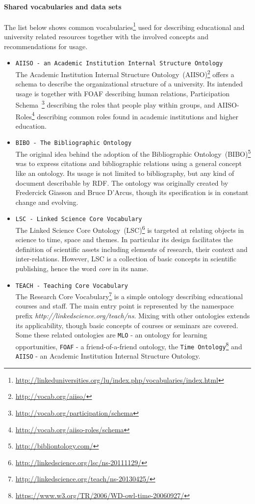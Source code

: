 \documentclass{article}
\begin{document}
\paragraph{Shared vocabularies and data sets}
The list below shows common vocabularies\footnote{\url{http://linkeduniversities.org/lu/index.php/vocabularies/index.html}} used for describing educational and university related resources together
with the involved concepts and recommendations for usage. 
\begin{itemize}
	\item \texttt{AIISO - an Academic Institution Internal Structure Ontology}~\\
	The Academic Institution Internal Structure Ontology~(AIISO)\footnote{\url{http://vocab.org/aiiso/}} offers a schema to describe the organizational structure of a university. Its intended usage is together with
	FOAF describing human relations, Participation Schema~\footnote{\url{http://vocab.org/participation/schema}} describing the roles that people play within groups, and AIISO-Roles\footnote{\url{http://vocab.org/aiiso-roles/schema}} describing common roles found in academic institutions and higher education. 
	\item \texttt{BIBO - The Bibliographic Ontology}~\\
	The original idea behind the adoption of the Bibliographic Ontology~(BIBO)\footnote{\url{http://bibliontology.com/}} was to express citations and bibliographic relations using a general concept like an ontology. Its usage is not limited to bibliography, but any kind of document describable by RDF. The ontology was originally created by Fredercick Giasson and Bruce D'Arcus, though its specification is in constant change and evolving. 
	\item \texttt{LSC - Linked Science Core Vocabulary}~\\
	The Linked Science Core Ontology~(LSC)\footnote{\url{http://linkedscience.org/lsc/ns-20111129/}} is targeted at relating objects in science to time, space and themes. In particular its design facilitates the definition of scientific assets including elements of research, their context and inter-relations. However, LSC is a collection of basic concepts in scientific publishing, hence the word \textit{core} in its name.  
	\item \texttt{TEACH - Teaching Core Vocabulary}~\\
	The Research Core Vocabulary\footnote{\url{http://linkedscience.org/teach/ns-20130425/}} is a simple ontology describing educational courses and staff.
	The main entry point is represented by the namespace prefix \textit{http://linkedscience.org/teach/ns}.
	Mixing with other ontologies 
	extends its applicability, though basic concepts of courses or seminars are covered. Some these related ontologies are \texttt{MLO} - an ontology for learning opportunities, 
	\texttt{FOAF} - a friend-of-a-friend ontology, the \texttt{Time Ontology}\footnote{\url{https://www.w3.org/TR/2006/WD-owl-time-20060927/}} and
	\texttt{AIISO} - an Academic Institution Internal Structure Ontology. 
\end{itemize}
\end{document}
